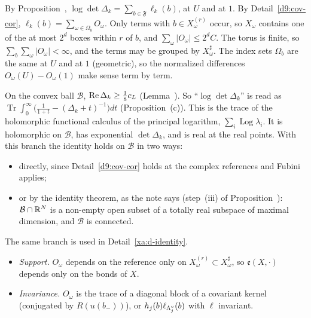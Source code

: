 \begin{detail}\label{d9:one-loop}
\begin{step}
By Proposition~, $\log\det\Delta_k=\sum_{b\in\mathfrak F}\ell_k(b)$, at $U$ and at $1$. By Detail~\ref{d9:cov-cor}, $\ell_k(b)=\sum_{\omega\in\Omega_b}O_\omega$. Only terms with $b\in X^{(r)}_\omega$ occur, so $X_\omega$ contains one of the at most $2^d$ boxes within $r$ of $b$, and $\sum_\omega|O_\omega|\le2^dC$. The torus is finite, so $\sum_b\sum_\omega|O_\omega|<\infty$, and the terms may be grouped by $X^\sharp_\omega$. The index sets $\Omega_b$ are the same at $U$ and at $1$ (geometric), so the normalized differences $O_\omega(U)-O_\omega(1)$ make sense term by term.
\end{step}
\begin{step}
On the convex ball $\mathcal B$, $\operatorname{Re}\Delta_k\ge\frac18c_L$ (Lemma~). So ``$\log\det\Delta_k$'' is read as $\operatorname{Tr}\int_0^\infty\big(\frac1{1+t}-(\Delta_k+t)^{-1}\big)dt$ (Proposition~(c)). This is the trace of the holomorphic functional calculus of the principal logarithm, $\sum_i\operatorname{Log}\lambda_i$. It is holomorphic on $\mathcal B$, has exponential $\det\Delta_k$, and is real at the real points. With this branch the identity holds on $\mathcal B$ in two ways:
\begin{itemize}
\item directly, since Detail~\ref{d9:cov-cor} holds at the complex references and Fubini applies;
\item or by the identity theorem, as the note says (step~(iii) of Proposition~): $\mathcal B\cap\mathbb R^N$ is a non-empty open subset of a totally real subspace of maximal dimension, and $\mathcal B$ is connected.
\end{itemize}
The same branch is used in Detail~\ref{xa:d-identity}.
\end{step}
\begin{step}
\begin{itemize}
\item \emph{Support.} $O_\omega$ depends on the reference only on $X^{(r)}_\omega\subset X^\sharp_\omega$, so $\mathfrak e(X,\cdot)$ depends only on the bonds of $X$.
\item \emph{Invariance.} $O_\omega$ is the trace of a diagonal block of a covariant kernel (conjugated by $R(u(b_-))$), or $h_j(b)\ell_{\Lambda^v_j}(b)$ with $\ell$ invariant.

\end{itemize}
\end{step}
\end{detail}
